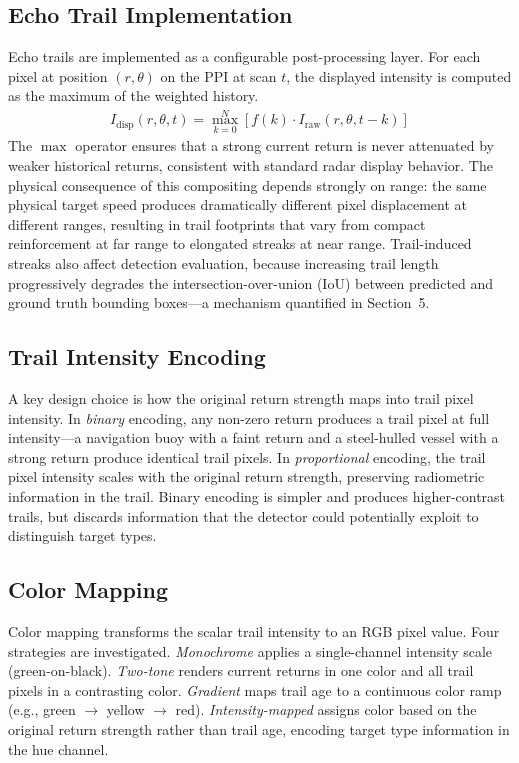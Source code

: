 \documentclass[twocolumn, 10pt]{article}
\begin{document}
\subsection{Echo Trail Implementation}

Echo trails are implemented as a configurable post-processing layer. For each pixel at position $(r, \theta)$ on the PPI at scan $t$, the displayed intensity is computed as the maximum of the weighted history.
\begin{align}
	I_{\mathrm{disp}}(r, \theta, t) = \max_{k=0}^{N} \left[ f(k) \cdot I_{\mathrm{raw}}(r, \theta, t-k) \right]
	\label{eq:trail_composite}
\end{align}
The $\max$ operator ensures that a strong current return is never attenuated by weaker historical returns, consistent with standard radar display behavior. The physical consequence of this compositing depends strongly on range: the same physical target speed produces dramatically different pixel displacement at different ranges, resulting in trail footprints that vary from compact reinforcement at far range to elongated streaks at near range. Trail-induced streaks also affect detection evaluation, because increasing trail length progressively degrades the intersection-over-union (IoU) between predicted and ground truth bounding boxes---a mechanism quantified in Section~5.

\subsection{Trail Intensity Encoding}

A key design choice is how the original return strength maps into trail pixel intensity. In \textit{binary} encoding, any non-zero return produces a trail pixel at full intensity---a navigation buoy with a faint return and a steel-hulled vessel with a strong return produce identical trail pixels. In \textit{proportional} encoding, the trail pixel intensity scales with the original return strength, preserving radiometric information in the trail. Binary encoding is simpler and produces higher-contrast trails, but discards information that the detector could potentially exploit to distinguish target types.

\subsection{Color Mapping}

Color mapping transforms the scalar trail intensity to an RGB pixel value. Four strategies are investigated. \textit{Monochrome} applies a single-channel intensity scale (green-on-black). \textit{Two-tone} renders current returns in one color and all trail pixels in a contrasting color. \textit{Gradient} maps trail age to a continuous color ramp (e.g., green $\rightarrow$ yellow $\rightarrow$ red). \textit{Intensity-mapped} assigns color based on the original return strength rather than trail age, encoding target type information in the hue channel.
\end{document}

